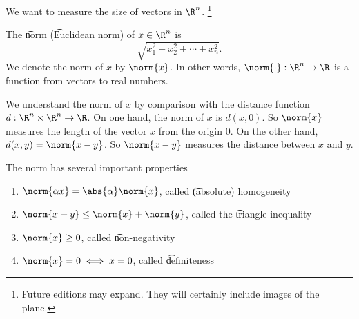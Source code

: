 
We want to measure the size of vectors in $\R^n$.
  \ifhmode\unskip\fi\footnote{
Future editions may expand. They will certainly include images of the plane.
  }

The \t{norm} (\t{Euclidean norm}) of $x \in \R^n$ is
  \[
\sqrt{x_1^2 + x_2^2 + \cdots + x_n^2}.
  \]
We denote the norm of $x$ by $\norm{x}$.
In other words, $\norm{\cdot}: \R^n \to \R$ is a function from vectors to real numbers.

We understand the norm of $x$ by comparison with the distance function $d: \R^n \times \R^n \to \R$.
On one hand, the norm of $x$ is $d(x, 0)$.
So $\norm{x}$ measures the length of the vector $x$ from the origin $0$.
On the other hand, $d(x, y) = \norm{x - y}$.
So $\norm{x - y}$ measures the distance between $x$ and $y$.

The norm has several important properties
  \begin{enumerate}
  \item $\norm{\alpha x} = \abs{\alpha}\norm{x}$, called \t{(absolute) homogeneity}
  \item $\norm{x + y} \leq \norm{x} + \norm{y}$, called the \t{triangle inequality}
  \item $\norm{x} \geq 0$, called \t{non-negativity}
  \item $\norm{x} = 0 \iff x = 0$, called \t{definiteness}
  \end{enumerate}

\blankpage

